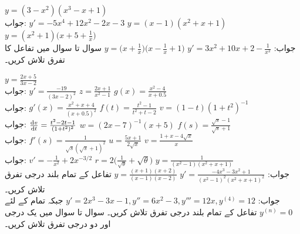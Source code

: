 $y=(3-x^2)(x^3-x+1)$\\
جواب:\quad
$y'=-5x^4+12x^2-2x-3$
$y=(x-1)(x^2+x+1)$
$y=(x^2+1)\big(x+5+\tfrac{1}{x}\big)$\\
جواب:\quad
$y'=3x^2+10x+2-\tfrac{1}{x^2}$
$y=\big(x+\tfrac{1}{x}\big)\big(x-\tfrac{1}{x}+1\big)$
سوال  تا سوال  میں تفاعل کا تفرق تلاش کریں۔

$y=\tfrac{2x+5}{3x-2}$\\
جواب:\quad
$y'=\tfrac{-19}{(3x-2)^2}$
$z=\tfrac{2x+1}{x^2-1}$
$g(x)=\tfrac{x^2-4}{x+0.5}$\\
جواب:\quad
$g'(x)=\tfrac{x^2+x+4}{(x+0.5)^2}$
$f(t)=\tfrac{t^2-1}{t^2+t-2}$
$v=(1-t)(1+t^2)^{-1}$\\
جواب:\quad
$\tfrac{\dif v}{\dif t}=\tfrac{t^2-2t-1}{(1+t^2)^2}$
$w=(2x-7)^{-1}(x+5)$
$f(s)=\tfrac{\sqrt{s}-1}{\sqrt{s}+1}$\\
جواب:\quad
$f'(s)=\tfrac{1}{\sqrt{s}(\sqrt{s}+1)^2}$
$u=\tfrac{5x+1}{2\sqrt{x}}$
$v=\tfrac{1+x-4\sqrt{x}}{x}$\\
جواب:\quad
$v'=-\tfrac{1}{x^2}+2x^{-3/2}$
$r=2\big(\tfrac{1}{\sqrt{\theta}}+\sqrt{\theta}\big)$
$y=\tfrac{1}{(x^2-1)(x^2+x+1)}$\\
جواب:\quad
$y'=\tfrac{-4x^3-3x^2+1}{(x^2-1)^2(x^2+x+1)^2}$
$y=\tfrac{(x+1)(x+2)}{(x-1)(x-2)}$
تفاعل  کے تمام بلند درجی تفرق تلاش کریں۔\\
جواب:\quad
$y'=2x^3-3x-1, y''=6x^2-3,y'''=12x, y^{(4)}=12$
جبکہ تمام  کے لئے 
$y^{(n)}=0$
تفاعل  کے تمام بلند درجی تفرق تلاش کریں۔
سوال  تا سوال  میں یک درجی اور دو درجی تفرق تلاش کریں۔

